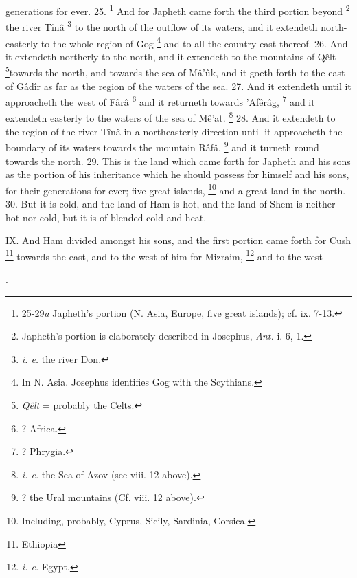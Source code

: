 generations for ever. 25. \footnote{25-29\emph{a} Japheth's portion (N. Asia, Europe, five great islands); cf. ix. 7-13.} And for Japheth came forth the third portion beyond \footnote{Japheth's portion is elaborately described in Josephus, \emph{Ant.} i. 6, 1.} the river Tînâ \footnote{\emph{i. e.} the river Don.} to the north of the outflow of its waters, and it extendeth north-easterly to the whole region of Gog \footnote{In N. Asia. Josephus identifies Gog with the Scythians.} and to all the country east thereof. 26. And it extendeth northerly to the north, and it extendeth to the mountains of Qêlt \footnote{\emph{Qêlt} = probably the Celts.}towards the north, and towards the sea of Mâ’ûk, and it goeth forth to the east of Gâdîr as far as the region of the waters of the sea. 27. And it extendeth until it approacheth the west of Fârâ \footnote{? Africa.} and it returneth towards ’Afêrâg, \footnote{? Phrygia.} and it extendeth easterly to the waters of the sea of Mê’at. \footnote{\emph{i. e.} the Sea of Azov (see viii. 12 above).} 28. And it extendeth to the region of the river Tînâ in a northeasterly direction until it approacheth the boundary of its waters towards the mountain Râfâ, \footnote{? the Ural mountains (Cf. viii. 12 above).} and it turneth round towards the north. 29. This is the land which came forth for Japheth and his sons as the portion of his inheritance which he should possess for himself and his sons, for their generations for ever; five great islands, \footnote{Including, probably, Cyprus, Sicily, Sardinia, Corsica.} and a great land in the north. 30. But it is cold, and the land of Ham is hot, and the land of Shem is neither hot nor cold, but it is of blended cold and heat.


IX. And Ham divided amongst his sons, and the first portion came forth for Cush \footnote{Ethiopia} towards the east, and to the west of him for Mizraim, \footnote{\emph{i. e.} Egypt.} and to the west

.

